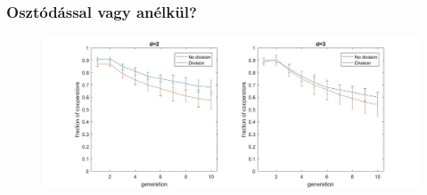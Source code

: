 \begin{frame}
	\frametitle{Osztódással vagy anélkül?}
	\begin{figure}
		\centering
		\includegraphics[width=\linewidth]{images/oszotas_nemosztodas}
	\end{figure}
\end{frame}
